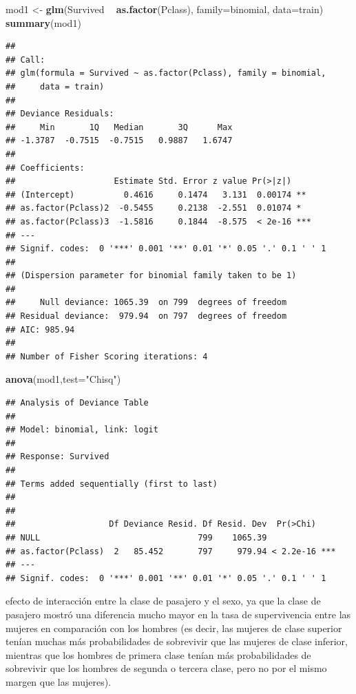 \documentclass[]{book}
\newenvironment{Shaded}{\begin{snugshade}}{\end{snugshade}}
\newcommand{\KeywordTok}[1]{\textcolor[rgb]{0.13,0.29,0.53}{\textbf{#1}}}
\newcommand{\DataTypeTok}[1]{\textcolor[rgb]{0.13,0.29,0.53}{#1}}
\newcommand{\StringTok}[1]{\textcolor[rgb]{0.31,0.60,0.02}{#1}}
\newcommand{\OperatorTok}[1]{\textcolor[rgb]{0.81,0.36,0.00}{\textbf{#1}}}
\newcommand{\NormalTok}[1]{#1}
\begin{document}
\begin{Shaded}
\begin{Highlighting}[]
\NormalTok{mod1 <-}\StringTok{ }\KeywordTok{glm}\NormalTok{(Survived }\OperatorTok{~}\StringTok{ }\KeywordTok{as.factor}\NormalTok{(Pclass), }\DataTypeTok{family=}\NormalTok{binomial, }\DataTypeTok{data=}\NormalTok{train)}
\KeywordTok{summary}\NormalTok{(mod1)}
\end{Highlighting}
\end{Shaded}

\begin{verbatim}
## 
## Call:
## glm(formula = Survived ~ as.factor(Pclass), family = binomial, 
##     data = train)
## 
## Deviance Residuals: 
##     Min       1Q   Median       3Q      Max  
## -1.3787  -0.7515  -0.7515   0.9887   1.6747  
## 
## Coefficients:
##                    Estimate Std. Error z value Pr(>|z|)    
## (Intercept)          0.4616     0.1474   3.131  0.00174 ** 
## as.factor(Pclass)2  -0.5455     0.2138  -2.551  0.01074 *  
## as.factor(Pclass)3  -1.5816     0.1844  -8.575  < 2e-16 ***
## ---
## Signif. codes:  0 '***' 0.001 '**' 0.01 '*' 0.05 '.' 0.1 ' ' 1
## 
## (Dispersion parameter for binomial family taken to be 1)
## 
##     Null deviance: 1065.39  on 799  degrees of freedom
## Residual deviance:  979.94  on 797  degrees of freedom
## AIC: 985.94
## 
## Number of Fisher Scoring iterations: 4
\end{verbatim}

\begin{Shaded}
\begin{Highlighting}[]
\KeywordTok{anova}\NormalTok{(mod1,}\DataTypeTok{test=}\StringTok{"Chisq"}\NormalTok{)}
\end{Highlighting}
\end{Shaded}

\begin{verbatim}
## Analysis of Deviance Table
## 
## Model: binomial, link: logit
## 
## Response: Survived
## 
## Terms added sequentially (first to last)
## 
## 
##                   Df Deviance Resid. Df Resid. Dev  Pr(>Chi)    
## NULL                                799    1065.39              
## as.factor(Pclass)  2   85.452       797     979.94 < 2.2e-16 ***
## ---
## Signif. codes:  0 '***' 0.001 '**' 0.01 '*' 0.05 '.' 0.1 ' ' 1
\end{verbatim}

efecto de interacción entre la clase de pasajero y el sexo, ya que la
clase de pasajero mostró una diferencia mucho mayor en la tasa de
supervivencia entre las mujeres en comparación con los hombres (es
decir, las mujeres de clase superior tenían muchas más probabilidades de
sobrevivir que las mujeres de clase inferior, mientras que los hombres
de primera clase tenían más probabilidades de sobrevivir que los hombres
de segunda o tercera clase, pero no por el mismo margen que las
mujeres).
\end{document}
